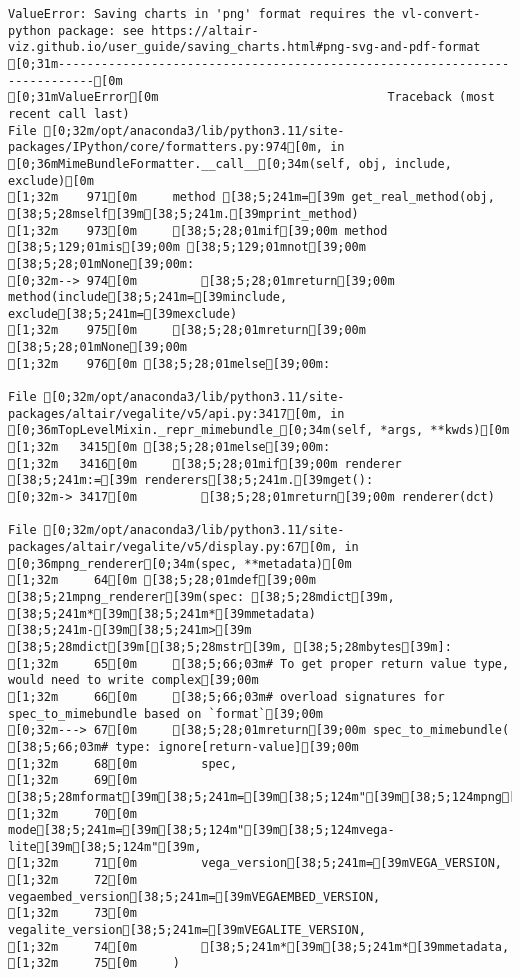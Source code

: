 \documentclass[
  letterpaper,
  DIV=11,
  numbers=noendperiod]{scrartcl}
\begin{document}
\begin{verbatim}
ValueError: Saving charts in 'png' format requires the vl-convert-python package: see https://altair-viz.github.io/user_guide/saving_charts.html#png-svg-and-pdf-format
[0;31m---------------------------------------------------------------------------[0m
[0;31mValueError[0m                                Traceback (most recent call last)
File [0;32m/opt/anaconda3/lib/python3.11/site-packages/IPython/core/formatters.py:974[0m, in [0;36mMimeBundleFormatter.__call__[0;34m(self, obj, include, exclude)[0m
[1;32m    971[0m     method [38;5;241m=[39m get_real_method(obj, [38;5;28mself[39m[38;5;241m.[39mprint_method)
[1;32m    973[0m     [38;5;28;01mif[39;00m method [38;5;129;01mis[39;00m [38;5;129;01mnot[39;00m [38;5;28;01mNone[39;00m:
[0;32m--> 974[0m         [38;5;28;01mreturn[39;00m method(include[38;5;241m=[39minclude, exclude[38;5;241m=[39mexclude)
[1;32m    975[0m     [38;5;28;01mreturn[39;00m [38;5;28;01mNone[39;00m
[1;32m    976[0m [38;5;28;01melse[39;00m:

File [0;32m/opt/anaconda3/lib/python3.11/site-packages/altair/vegalite/v5/api.py:3417[0m, in [0;36mTopLevelMixin._repr_mimebundle_[0;34m(self, *args, **kwds)[0m
[1;32m   3415[0m [38;5;28;01melse[39;00m:
[1;32m   3416[0m     [38;5;28;01mif[39;00m renderer [38;5;241m:=[39m renderers[38;5;241m.[39mget():
[0;32m-> 3417[0m         [38;5;28;01mreturn[39;00m renderer(dct)

File [0;32m/opt/anaconda3/lib/python3.11/site-packages/altair/vegalite/v5/display.py:67[0m, in [0;36mpng_renderer[0;34m(spec, **metadata)[0m
[1;32m     64[0m [38;5;28;01mdef[39;00m [38;5;21mpng_renderer[39m(spec: [38;5;28mdict[39m, [38;5;241m*[39m[38;5;241m*[39mmetadata) [38;5;241m-[39m[38;5;241m>[39m [38;5;28mdict[39m[[38;5;28mstr[39m, [38;5;28mbytes[39m]:
[1;32m     65[0m     [38;5;66;03m# To get proper return value type, would need to write complex[39;00m
[1;32m     66[0m     [38;5;66;03m# overload signatures for spec_to_mimebundle based on `format`[39;00m
[0;32m---> 67[0m     [38;5;28;01mreturn[39;00m spec_to_mimebundle(  [38;5;66;03m# type: ignore[return-value][39;00m
[1;32m     68[0m         spec,
[1;32m     69[0m         [38;5;28mformat[39m[38;5;241m=[39m[38;5;124m"[39m[38;5;124mpng[39m[38;5;124m"[39m,
[1;32m     70[0m         mode[38;5;241m=[39m[38;5;124m"[39m[38;5;124mvega-lite[39m[38;5;124m"[39m,
[1;32m     71[0m         vega_version[38;5;241m=[39mVEGA_VERSION,
[1;32m     72[0m         vegaembed_version[38;5;241m=[39mVEGAEMBED_VERSION,
[1;32m     73[0m         vegalite_version[38;5;241m=[39mVEGALITE_VERSION,
[1;32m     74[0m         [38;5;241m*[39m[38;5;241m*[39mmetadata,
[1;32m     75[0m     )


\end{verbatim}
\end{document}
